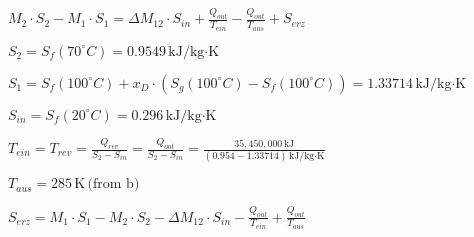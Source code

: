 \( M_2 \cdot S_2 - M_1 \cdot S_1 = \Delta M_{12} \cdot S_{in} + \frac{Q_{out}}{T_{ein}} - \frac{Q_{out}}{T_{aus}} + S_{erz} \)  

\( S_2 = S_f(70^\circ C) = 0.9549 \, \text{kJ/kg·K} \)  

\( S_1 = S_f(100^\circ C) + x_D \cdot (S_g(100^\circ C) - S_f(100^\circ C)) = 1.33714 \, \text{kJ/kg·K} \)  

\( S_{in} = S_f(20^\circ C) = 0.296 \, \text{kJ/kg·K} \)  

\( T_{ein} = T_{rev} = \frac{Q_{rev}}{S_2 - S_{in}} = \frac{Q_{out}}{S_2 - S_{in}} = \frac{35,450,000 \, \text{kJ}}{(0.954 - 1.33714) \, \text{kJ/kg·K}} \)  

\( T_{aus} = 285 \, \text{K} \, \text{(from b)} \)  

\( S_{erz} = M_1 \cdot S_1 - M_2 \cdot S_2 - \Delta M_{12} \cdot S_{in} - \frac{Q_{out}}{T_{ein}} + \frac{Q_{out}}{T_{aus}} \)